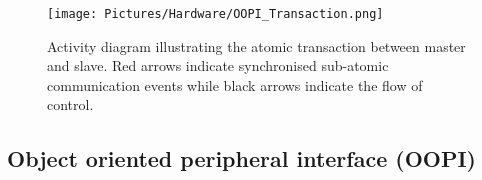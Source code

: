 
     \begin{figure}[H]
        \centering
        \texttt{[image: Pictures/Hardware/OOPI\_Transaction.png]}
        \vspace{5mm}
        \caption{Activity diagram illustrating the atomic transaction between master and slave. Red arrows indicate synchronised sub-atomic communication events while black arrows indicate the flow of control.}
        \label{fig:OOPI_Transaction}
    \end{figure}

\subsection{Object oriented peripheral interface (OOPI)} %

